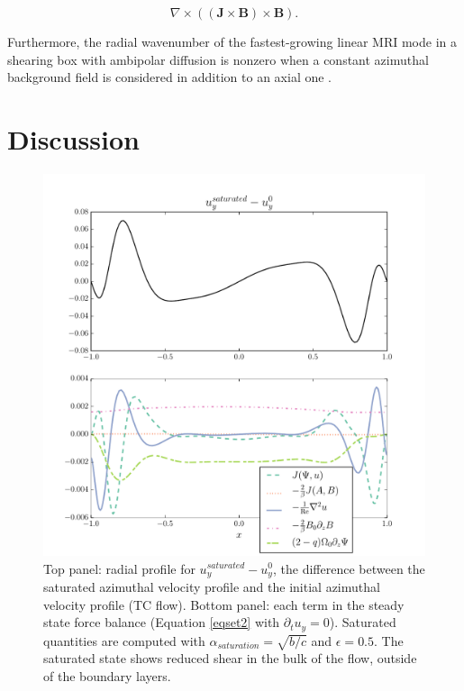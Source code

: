 \documentclass{emulateapj}
\newcommand{\beq}{\begin{equation}}
\newcommand{\eeq}{\end{equation}}
\begin{document}
\beq
\nabla \times ((\mathbf{J} \times \mathbf{B}) \times \mathbf{B}). 
\eeq

Furthermore, the radial wavenumber of the fastest-growing linear MRI mode in a shearing box with ambipolar diffusion is nonzero when a constant azimuthal background field is considered in addition to an axial one \citep{Kunz:2004ib}.


\section{Discussion}
\label{sec:discussion}

\begin{figure}
\centering
\includegraphics[width=\columnwidth]{thingap_saturation_mechanism_plots_velocity_slice60.pdf}
\caption{Top panel: radial profile for $u_y^{saturated} - u_y^0$, the difference between the saturated azimuthal velocity profile and the initial azimuthal velocity profile (TC flow). Bottom panel: each term in the steady state force balance (Equation \ref{eqset2} with $\partial_t u_{y} = 0$). Saturated quantities are computed with $\alpha_{saturation} = \sqrt{b/c}$ and $\epsilon = 0.5$. The saturated state shows reduced shear in the bulk of the flow, outside of the boundary layers.} \label{fig:sat_comp_vel}
\end{figure}
\end{document}
